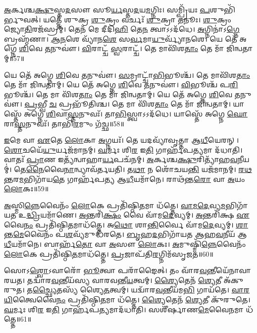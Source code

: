 \-\ul{𑌅}\-𑌰𑍍𑌕𑌶𑍍𑌚\-\ul{𑌕𑍍𑌷𑍁}\-𑌸𑍍𑌤\-\ul{𑌦}\-𑌸𑍗 𑌸𑍂\-\ul{𑌰𑍍𑌯}\-𑌸𑍍𑌤\-\ul{𑌦}\-𑌯\-\ul{𑌮}\-𑌗𑍍𑌨𑌿𑌃।
𑌸𑌮𑍍𑌪𑍍𑌰𑌿᳴𑌯𑌃 \ul{𑌪}\-𑌶𑍁𑌭𑌿᳴𑌰𑍍𑌭𑍁𑌵𑌤𑍍।
𑌯𑌤𑍍𑌤𑍇᳴ 𑌶𑍁𑌕𑍍𑌰 \ul{𑌶𑍁}\-𑌕𑍍𑌰𑌂 𑌵𑌰𑍍𑌚𑌃᳴ \ul{𑌶𑍁}\-𑌕𑍍𑌰𑌾 \ul{𑌤}\-𑌨𑍂𑌃।
\-\ul{𑌶𑍁}\-𑌕𑍍𑌰𑌂 𑌜𑍍𑌯𑍋\-\ul{𑌤𑌿}\-𑌰𑌜᳴𑌸𑍍𑌰𑌮𑍍।
𑌤𑍇𑌨᳴ 𑌮𑍇 𑌦𑍀𑌦𑌿\-\ul{𑌹𑌿} 𑌤𑍇\-\ul{𑌨} 𑌤𑍍𑌵𑌾𑌽𑌽𑌦᳴𑌧𑍇।
\-\ul{𑌅}\-𑌗𑍍𑌨𑌿𑌨𑌾॑\-𑌽\-\ul{𑌗𑍍𑌨𑍇} 𑌬𑍍𑌰𑌹𑍍𑌮᳴𑌣𑌾।
\-\ul{𑌆}\-\-\ul{𑌨}\-𑌶𑍇 𑌵𑍍𑌯𑌾᳴𑌨\-\ul{𑌶𑍇} 𑌸\-\ul{𑌰𑍍𑌵}\-𑌮𑌾\-\ul{𑌯𑍁}\-𑌰𑍍𑌵𑍍𑌯𑌾᳴𑌨𑌶𑍇।
𑌯𑍇 𑌤𑍇᳴ 𑌅𑌗𑍍𑌨𑍇 \ul{𑌶𑌿}\-𑌵𑍇 \ul{𑌤}\-𑌨𑍁𑌵𑍗॑।
\-\ul{𑌵𑌿}\-𑌰𑌾𑌟𑍍𑌚᳴ \ul{𑌸𑍍𑌵}\-𑌰𑌾𑌟𑍍𑌚᳴।
𑌤𑍇 𑌮𑌾𑌵𑌿᳴𑌶\-\ul{𑌤𑌾𑌂} 𑌤𑍇 𑌮𑌾᳴ 𑌜𑌿𑌨𑍍𑌵𑌤𑌾𑌮𑍍॥57॥

𑌯𑍇 𑌤𑍇᳴ 𑌅𑌗𑍍𑌨𑍇 \ul{𑌶𑌿}\-𑌵𑍇 \ul{𑌤}\-𑌨𑍁𑌵𑍗॑।
\-\ul{𑌸}\-𑌮𑍍𑌰𑌾𑌟𑍍𑌚𑌾᳴\-\ul{𑌭𑌿}\-𑌭𑍂𑌶𑍍𑌚᳴।
𑌤𑍇 𑌮𑌾𑌵𑌿᳴𑌶\-\ul{𑌤𑌾𑌂} 𑌤𑍇 𑌮𑌾᳴ 𑌜𑌿𑌨𑍍𑌵𑌤𑌾𑌮𑍍।
𑌯𑍇 𑌤𑍇᳴ 𑌅𑌗𑍍𑌨𑍇 \ul{𑌶𑌿}\-𑌵𑍇 \ul{𑌤}\-𑌨𑍁𑌵𑍗॑।
\-\ul{𑌵𑌿}\-𑌭𑍂𑌶𑍍𑌚᳴ 𑌪\-\ul{𑌰𑌿}\-𑌭𑍂𑌶𑍍𑌚᳴।
𑌤𑍇 𑌮𑌾 𑌵𑌿᳴𑌶\-\ul{𑌤𑌾𑌂} 𑌤𑍇 𑌮𑌾᳴ 𑌜𑌿𑌨𑍍𑌵𑌤𑌾𑌮𑍍।
𑌯𑍇 𑌤𑍇᳴ 𑌅𑌗𑍍𑌨𑍇 \ul{𑌶𑌿}\-𑌵𑍇 \ul{𑌤}\-𑌨𑍁𑌵𑍗॑।
\-\ul{𑌪𑍍𑌰}\-𑌭𑍍𑌵𑍀 \ul{𑌚} 𑌪𑍍𑌰𑌭𑍂᳴𑌤𑌿𑌶𑍍𑌚।
𑌤𑍇 𑌮𑌾 𑌵𑌿᳴𑌶\-\ul{𑌤𑌾𑌂} 𑌤𑍇 𑌮𑌾᳴ 𑌜𑌿𑌨𑍍𑌵𑌤𑌾𑌮𑍍।
𑌯𑌾𑌸𑍍𑌤𑍇᳴ 𑌅𑌗𑍍𑌨𑍇 \ul{𑌶𑌿}\-𑌵𑌾\-\ul{𑌸𑍍𑌤}\-𑌨𑍁𑌵𑌃᳴।
𑌤𑌾\-\ul{𑌭𑌿}\-𑌸𑍍𑌤𑍍𑌵𑌾𑌽𑌽𑌦᳴𑌧𑍇।
𑌯𑌾𑌸𑍍𑌤𑍇᳴ 𑌅𑌗𑍍𑌨𑍇 \ul{𑌘𑍋}\-𑌰𑌾\-\ul{𑌸𑍍𑌤}\-𑌨𑍁𑌵𑌃᳴।
𑌤𑌾𑌭𑌿᳴\-\ul{𑌰}\-𑌮𑍁𑌂 𑌗᳴𑌚𑍍𑌛॥58॥\anuvakamend[𑌚𑌤𑍁᳴𑌷𑍍𑌪𑌦𑍇 𑌜𑌿𑌨𑍍𑌵𑌤𑌾𑌂 \ul{𑌤}\-𑌨𑍁\-\ul{𑌵}\-𑌸𑍍𑌤𑍍𑌰𑍀𑌣𑌿᳴ 𑌚]

\-\ul{𑌇}\-𑌮𑍇 𑌵𑌾 \ul{𑌏}\-𑌤𑍇 \ul{𑌲𑍋}\-𑌕𑌾 \ul{𑌅}\-𑌗𑍍𑌨𑌯𑌃᳴।
𑌤𑍇 𑌯𑌦𑌵𑍍𑌯𑌾᳴𑌵𑍃𑌤𑍍𑌤𑌾 𑌆\-\ul{𑌧𑍀}\-𑌯𑍇𑌰𑌨𑍍।
\-\ul{𑌶𑍋}\-𑌚𑌯𑍇᳴\-\ul{𑌯𑍁}\-𑌰𑍍𑌯𑌜᳴𑌮𑌾𑌨𑌮𑍍।
\-\ul{𑌘}\-𑌰𑍍𑌮𑌃 𑌶𑌿\-\ul{𑌰} 𑌇\-\ul{𑌤𑌿} 𑌗𑌾𑌰𑍍\mbox{}𑌹᳴𑌪\-\ul{𑌤𑍍𑌯}\-𑌮𑌾 𑌦᳴𑌧𑌾𑌤𑌿।
𑌵𑌾𑌤𑌃᳴ \ul{𑌪𑍍𑌰𑌾}\-𑌣 𑌇𑌤𑍍𑌯᳴𑌨𑍍𑌵𑌾𑌹𑌾\-\ul{𑌰𑍍𑌯}\-𑌪𑌚᳴𑌨𑌮𑍍।
\-\ul{𑌅}\-𑌰𑍍𑌕𑌶𑍍𑌚\-\ul{𑌕𑍍𑌷𑍁}\-𑌰𑌿𑌤𑍍𑌯𑌾᳴𑌹\-\ul{𑌵}\-𑌨𑍀𑌯𑌮𑍍॑।
𑌤𑍇\-\ul{𑌨𑍈}\-𑌵𑍈\-\ul{𑌨𑌾}\-𑌨𑍍𑌵𑍍𑌯𑌾𑌵᳴𑌰𑍍𑌤𑌯𑌤𑌿।
𑌤\-\ul{𑌥𑌾} 𑌨 𑌶𑍋᳴𑌚𑌯\-\ul{𑌨𑍍𑌤𑌿} 𑌯𑌜᳴𑌮𑌾𑌨𑌮𑍍।
\-\ul{𑌰}\-\-\ul{𑌥}\-\-\ul{𑌨𑍍𑌤}\-𑌰\-\ul{𑌮}\-𑌭𑌿𑌗𑌾᳴𑌯\-\ul{𑌤𑍇} 𑌗𑌾𑌰𑍍\mbox{}𑌹᳴𑌪𑌤𑍍𑌯 𑌆\-\ul{𑌧𑍀}\-𑌯𑌮𑌾᳴𑌨𑍇।
𑌰𑌾𑌥᳴𑌨𑍍𑌤\-\ul{𑌰𑍋} 𑌵𑌾 \ul{𑌅}\-𑌯𑌂 \ul{𑌲𑍋}\-𑌕𑌃॥59॥

\-\ul{𑌅}\-𑌸𑍍𑌮𑌿\-\ul{𑌨𑍍𑌨𑍇}\-𑌵𑍈𑌨𑌂᳴ \ul{𑌲𑍋}\-𑌕𑍇 𑌪𑍍𑌰𑌤𑌿᳴\-𑌷𑍍𑌠𑌿\-\ul{𑌤}\-𑌮𑌾 𑌧᳴𑌤𑍍𑌤𑍇।
\-\ul{𑌵𑌾}\-\-\ul{𑌮}\-\-\ul{𑌦𑍇}\-𑌵𑍍𑌯\-\ul{𑌮}\-𑌭𑌿𑌗𑌾᳴𑌯𑌤 𑌉\-\ul{𑌦𑍍𑌧𑍍𑌰𑌿}\-𑌯𑌮𑌾᳴𑌣𑍇।
\-\ul{𑌅}\-𑌨𑍍𑌤𑌰𑌿᳴\-\ul{𑌕𑍍𑌷𑌂} 𑌵𑍈 𑌵𑌾᳴𑌮\-\ul{𑌦𑍇}\-𑌵𑍍𑌯𑌮𑍍।
\-\ul{𑌅}\-𑌨𑍍𑌤𑌰𑌿᳴𑌕𑍍𑌷 \ul{𑌏}\-𑌵𑍈\-\ul{𑌨𑌂} 𑌪𑍍𑌰𑌤𑌿᳴\-𑌷𑍍𑌠𑌿\-\ul{𑌤}\-𑌮𑌾𑌧᳴𑌤𑍍𑌤𑍇।
𑌅\-\ul{𑌥𑍋} 𑌶𑌾\-\ul{𑌨𑍍𑌤𑌿}\-𑌰𑍍𑌵𑍈 𑌵𑌾᳴𑌮\-\ul{𑌦𑍇}\-𑌵𑍍𑌯𑌮𑍍।
\-\ul{𑌶𑌾}\-𑌨𑍍𑌤\-\ul{𑌮𑍇}\-𑌵𑍈𑌨𑌂᳴ 𑌪\-\ul{𑌶}\-𑌵𑍍𑌯᳴𑌮𑍁𑌦𑍍𑌧᳴𑌰𑌤𑍇।
\-\ul{𑌬𑍃}\-𑌹\-\ul{𑌦}\-𑌭𑌿𑌗𑌾᳴𑌯𑌤 𑌆𑌹\-\ul{𑌵}\-𑌨𑍀𑌯᳴ 𑌆\-\ul{𑌧𑍀}\-𑌯𑌮𑌾᳴𑌨𑍇।
𑌬𑌾𑌰𑍍\mbox{}𑌹᳴\-\ul{𑌤𑍋} 𑌵𑌾 \ul{𑌅}\-𑌸𑍗 \ul{𑌲𑍋}\-𑌕𑌃।
\-\ul{𑌅}\-𑌮𑍁𑌷𑍍𑌮𑌿᳴\-\ul{𑌨𑍍𑌨𑍇}\-𑌵𑍈𑌨𑌂᳴ \ul{𑌲𑍋}\-𑌕𑍇 𑌪𑍍𑌰𑌤𑌿᳴\-𑌷𑍍𑌠𑌿\-\ul{𑌤}\-𑌮𑌾𑌧᳴𑌤𑍍𑌤𑍇।
\-\ul{𑌪𑍍𑌰}\-𑌜𑌾𑌪᳴𑌤𑌿\-\ul{𑌰}\-𑌗𑍍𑌨𑌿𑌮᳴\-𑌸𑍃𑌜𑌤॥60॥

𑌸𑍋𑌽\-\ul{𑌶𑍍𑌵𑍋}\-\-𑌽𑌵𑌾𑌰𑍋᳴ \ul{𑌭𑍂}\-𑌤𑍍𑌵𑌾 𑌪𑌰𑌾᳴𑌙𑍈𑌤𑍍।
𑌤𑌂 𑌵𑌾᳴𑌰\-\ul{𑌵}\-𑌨𑍍𑌤𑍀𑌯𑍇᳴𑌨𑌾𑌵𑌾𑌰𑌯𑌤।
𑌤𑌦𑍍𑌵𑌾᳴𑌰\-\ul{𑌵}\-𑌨𑍍𑌤𑍀𑌯᳴𑌸𑍍𑌯 𑌵𑌾𑌰𑌵𑌨𑍍𑌤𑍀\-\ul{𑌯}\-𑌤𑍍𑌵𑌮𑍍।
\-\ul{𑌶𑍍𑌯𑍈}\-𑌤𑍇𑌨᳴ \ul{𑌶𑍍𑌯𑍇}\-𑌤𑍀 𑌅᳴𑌕𑍁𑌰𑍁𑌤।
𑌤\-\ul{𑌚𑍍𑌛𑍍𑌯𑍈}\-𑌤𑌸𑍍𑌯᳴ 𑌶𑍍𑌯𑍈\-\ul{𑌤}\-𑌤𑍍𑌵𑌮𑍍।
𑌯𑌦𑍍𑌵𑌾᳴𑌰\-\ul{𑌵}\-𑌨𑍍𑌤𑍀𑌯᳴𑌮\-\ul{𑌭𑌿} 𑌗𑌾𑌯᳴𑌤𑍇।
\-\ul{𑌵𑌾}\-\-\ul{𑌰}\-\-\ul{𑌯𑌿}\-𑌤𑍍𑌵𑍈𑌵𑍈\-\ul{𑌨𑌂} 𑌪𑍍𑌰𑌤𑌿᳴\-𑌷𑍍𑌠𑌿\-\ul{𑌤}\-𑌮𑌾 𑌧᳴𑌤𑍍𑌤𑍇।
\-\ul{𑌶𑍍𑌯𑍈}\-𑌤𑍇𑌨᳴ \ul{𑌶𑍍𑌯𑍇}\-𑌤𑍀 𑌕𑍁᳴𑌰𑍁𑌤𑍇।
\-\ul{𑌘}\-𑌰𑍍𑌮𑌃 𑌶𑌿\-\ul{𑌰} 𑌇\-\ul{𑌤𑌿} 𑌗𑌾𑌰𑍍\mbox{}𑌹᳴𑌪\-\ul{𑌤𑍍𑌯}\-𑌮𑌾𑌦᳴𑌧𑌾𑌤𑌿।
𑌸𑌶𑍀᳴𑌰𑍍\mbox{}𑌷𑌾𑌣\-\ul{𑌮𑍇}\-𑌵𑍈\-\ul{𑌨}\-𑌮𑌾 𑌧᳴𑌤𑍍𑌤𑍇॥61॥

